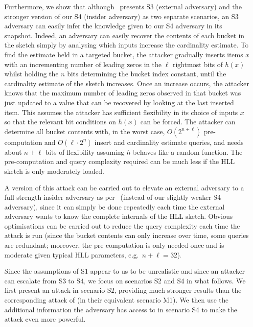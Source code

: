 \documentclass[11pt]{article}
\begin{document}
Furthermore, we show that although~\cite{cardestprivacy} presents S3 (external adversary) and the stronger version of our S4 (insider adversary) as two separate scenarios, an S3 adversary can easily infer the knowledge given to our S4 adversary in its snapshot. Indeed, an adversary can easily recover the contents of each bucket in the sketch simply by analysing which inputs increase the cardinality estimate. To find the estimate held in a targeted bucket, the attacker gradually inserts items $x$ with an incrementing number of leading zeros in the $\ell$ rightmost bits of $h(x)$ whilst holding the $n$ bits determining the bucket index constant, until the cardinality estimate of the sketch increases. Once an increase occurs, the attacker knows that the maximum number of leading zeros observed in that bucket was just updated to a value that can be recovered by looking at the last inserted item. This assumes the attacker has sufficient flexibility in its choice of inputs $x$ so that the relevant bit conditions on $h(x)$ can be forced. The attacker can determine all bucket contents with, in the worst case, $O(2^{n + \ell})$ pre-computation and $O(\ell \cdot 2^{n})$ insert and cardinality estimate queries, and needs about $n + \ell$ bits of flexibility assuming $h$ behaves like a random function. The pre-computation and query complexity required can be much less if the HLL sketch is only moderately loaded.

A version of this attack can be carried out to elevate an external adversary to a full-strength insider adversary as per~\cite{cardestprivacy} (instead of our slightly weaker S4 adversary), since it can simply be done repeatedly each time the external adversary wants to know the complete internals of the HLL sketch. Obvious optimisations can be carried out to reduce the query complexity each time the attack is run (since the bucket contents can only increase over time, some queries are redundant; moreover, the pre-computation is only needed once and is moderate given typical HLL parameters, e.g.\ $n+\ell = 32$).

Since the assumptions of S1 appear to us to be unrealistic and since an attacker can escalate from S3 to S4, we focus on scenarios S2 and S4 in what follows. We first present an attack in scenario S2, providing much stronger results than the corresponding attack of \cite{hllvuln} (in their equivalent scenario M1). We then use the additional information the adversary has access to in scenario S4 to make the attack even more powerful.
\end{document}
